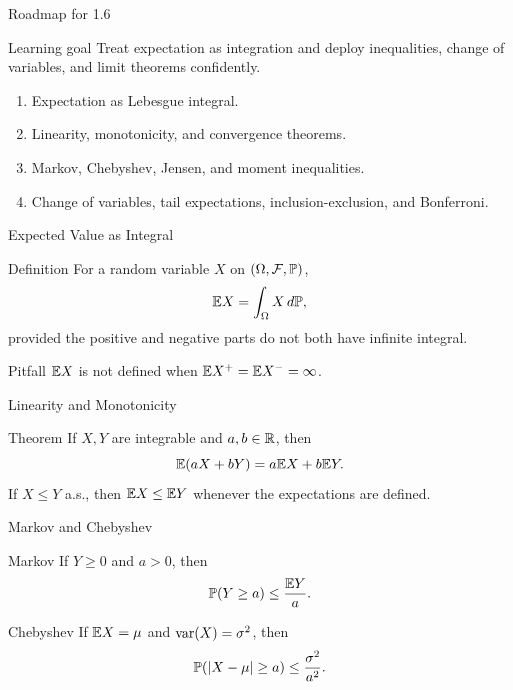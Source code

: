 \begin{frame}{Roadmap for 1.6}
  \begin{block}{Learning goal}
    Treat expectation as integration and deploy inequalities, change of variables, and limit theorems confidently.
  \end{block}
  \begin{enumerate}
    \item Expectation as Lebesgue integral.
    \item Linearity, monotonicity, and convergence theorems.
    \item Markov, Chebyshev, Jensen, and moment inequalities.
    \item Change of variables, tail expectations, inclusion-exclusion, and Bonferroni.
  \end{enumerate}
\end{frame}

\begin{frame}{Expected Value as Integral}
  \begin{block}{Definition}
    For a random variable $X$ on $(\Omega,\mathcal F,\mathbb{P})$,
    \[
      \mathbb{E} X=\int_\Omega X\,d\mathbb{P},
    \]
    provided the positive and negative parts do not both have infinite integral.
  \end{block}
  \begin{alertblock}{Pitfall}
    $\mathbb{E} X$ is not defined when $\mathbb{E} X^+=\mathbb{E} X^-=\infty$.
  \end{alertblock}
\end{frame}

\begin{frame}{Linearity and Monotonicity}
  \begin{block}{Theorem}
    If $X,Y$ are integrable and $a,b\in\mathbb{R}$, then
    \[
      \mathbb{E}(aX+bY)=a\mathbb{E} X+b\mathbb{E} Y.
    \]
    If $X\le Y$ a.s., then $\mathbb{E} X\le \mathbb{E} Y$ whenever the expectations are defined.
  \end{block}
\end{frame}

\begin{frame}{Markov and Chebyshev}
  \begin{block}{Markov}
    If $Y\ge0$ and $a>0$, then
    \[
      \mathbb{P}(Y\ge a)\le \frac{\mathbb{E} Y}{a}.
    \]
  \end{block}
  \begin{block}{Chebyshev}
    If $\mathbb{E} X=\mu$ and $\operatorname{var}(X)=\sigma^2$, then
    \[
      \mathbb{P}(|X-\mu|\ge a)\le \frac{\sigma^2}{a^2}.
    \]
  \end{block}
\end{frame}

